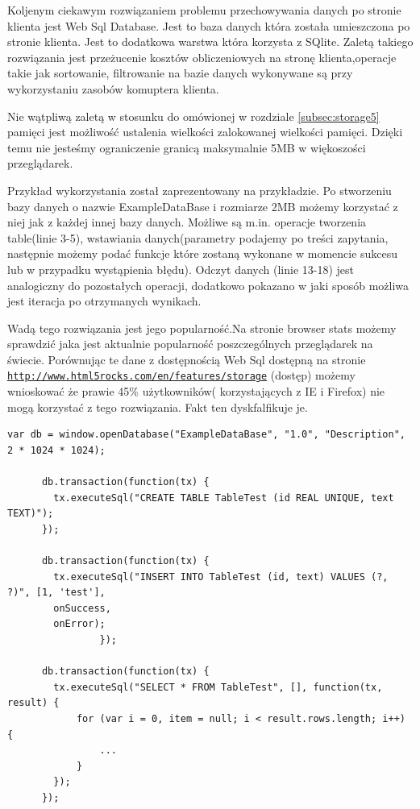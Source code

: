 Koljenym ciekawym rozwiązaniem problemu przechowywania danych po stronie klienta jest Web Sql Database.
Jest to baza danych która została umieszczona po stronie klienta. Jest to dodatkowa warstwa która korzysta z SQlite.
Zaletą takiego rozwiązania jest przeżucenie kosztów obliczeniowych na stronę klienta,operacje takie jak sortowanie, filtrowanie na bazie danych wykonywane są przy wykorzystaniu zasobów komuptera klienta.

Nie wątpliwą zaletą w stosunku do omówionej w rozdziale \ref{subsec:storage5} pamięci jest możliwość ustalenia wielkości zalokowanej wielkości pamięci. Dzięki temu nie jesteśmy ograniczenie granicą maksymalnie 5MB w więkoszości przeglądarek.

Przykład wykorzystania został zaprezentowany na przykładzie. Po stworzeniu bazy danych o nazwie ExampleDataBase i rozmiarze 2MB możemy korzystać z niej jak z każdej innej bazy danych. Możliwe są m.in. operacje tworzenia table(linie 3-5), wstawiania danych(parametry podajemy po treści zapytania, następnie możemy podać funkcje które zostaną wykonane w momencie sukcesu lub w przypadku wystąpienia błędu). Odczyt danych (linie 13-18) jest analogiczny do pozostałych operacji, dodatkowo pokazano w jaki sposób możliwa jest iteracja po otrzymanych wynikach.

Wadą tego rozwiązania jest jego popularność.Na stronie browser stats  możemy sprawdzić jaka jest aktualnie popularność poszczególnych przeglądarek na świecie. Porównując te dane z dostępnością Web Sql dostępną na stronie \underline{\texttt{http://www.html5rocks.com/en/features/storage}} (dostęp) możemy wnioskować że prawie 45\% użytkowników( korzystających z IE i Firefox) nie mogą korzystać z tego rozwiązania. Fakt ten dyskfalfikuje je.

\lstset{language=JavaScript}
\label{lis:webSql}
\begin{lstlisting}[caption=json]
      var db = window.openDatabase("ExampleDataBase", "1.0", "Description", 2 * 1024 * 1024);

      db.transaction(function(tx) {
        tx.executeSql("CREATE TABLE TableTest (id REAL UNIQUE, text TEXT)");
      });

      db.transaction(function(tx) {
        tx.executeSql("INSERT INTO TableTest (id, text) VALUES (?, ?)", [1, 'test'],
        onSuccess,
        onError);
                });

      db.transaction(function(tx) {
        tx.executeSql("SELECT * FROM TableTest", [], function(tx, result) {
            for (var i = 0, item = null; i < result.rows.length; i++) {
                ...
			}
        });
      });
\end{lstlisting}

